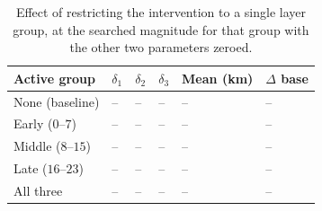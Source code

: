 \begin{table}[h]
\centering
\caption{Effect of restricting the intervention to a single layer group, at the
searched magnitude for that group with the other two parameters zeroed.}
\label{tab:groups}
\setlength{\tabcolsep}{5pt}
\begin{tabular}{L{3.4cm}|P{1.4cm}P{1.4cm}P{1.4cm}|P{1.7cm}P{1.7cm}}
\toprule
\textbf{Active group} & $\delta_1$ & $\delta_2$ & $\delta_3$ &
\textbf{Mean (km)} & \textbf{$\Delta$ base} \\
\midrule
None (baseline) & -- & -- & -- & -- & -- \\
Early ($0$--$7$) & -- & -- & -- & -- & -- \\
Middle ($8$--$15$) & -- & -- & -- & -- & -- \\
Late ($16$--$23$) & -- & -- & -- & -- & -- \\
All three & -- & -- & -- & -- & -- \\
\bottomrule
\end{tabular}
\end{table}
